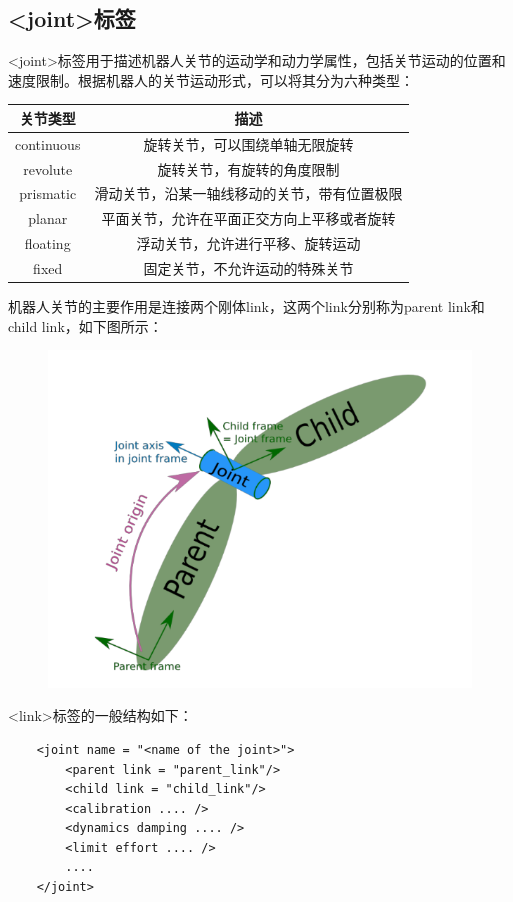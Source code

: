 \documentclass[10pt, oneside]{book}
\begin{document}
\subsection{<joint>标签}\label{subsec:joint}

<joint>标签用于描述机器人关节的运动学和动力学属性，包括关节运动的位置和速度限制。根据机器人的关节运动形式，可以将其分为六种类型：

\begin{table}[H]
    \centering
    \begin{tabular}{c|c}
    \hline
    \textbf{关节类型} & \textbf{描述}            \\ \hline
    continuous    & 旋转关节，可以围绕单轴无限旋转        \\ \hline
    revolute      & 旋转关节，有旋转的角度限制          \\ \hline
    prismatic     & 滑动关节，沿某一轴线移动的关节，带有位置极限 \\ \hline
    planar        & 平面关节，允许在平面正交方向上平移或者旋转  \\ \hline
    floating      & 浮动关节，允许进行平移、旋转运动       \\ \hline
    fixed         & 固定关节，不允许运动的特殊关节        \\ \hline
    \end{tabular}
\end{table}

机器人关节的主要作用是连接两个刚体link，这两个link分别称为parent link和child link，如下图所示：

\begin{figure}[H]
    \centering
    \includegraphics[width = 0.5\linewidth]{image/joint标签.png}
\end{figure}

<link>标签的一般结构如下：

\begin{verbatim}
    <joint name = "<name of the joint>">
        <parent link = "parent_link"/>
        <child link = "child_link"/>
        <calibration .... />
        <dynamics damping .... />
        <limit effort .... />
        ....
    </joint>
\end{verbatim}
\end{document}
